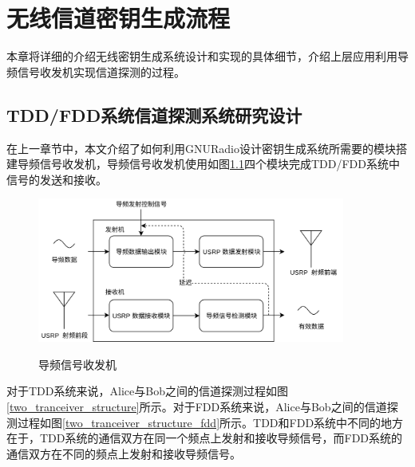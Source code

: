 



\chapter{无线信道密钥生成流程}

本章将详细的介绍无线密钥生成系统设计和实现的具体细节，介绍上层应用利用导频信号收发机实现信道探测的过程。%

\section{TDD/FDD系统信道探测系统研究设计}

在上一章节中，本文介绍了如何利用GNURadio设计密钥生成系统所需要的模块搭建导频信号收发机，导频信号收发机使用如图\ref{tranceiver_structure}四个模块完成TDD/FDD系统中信号的发送和接收。

\begin{figure}[htbp]
    \centering
    \includegraphics[width=0.9\textwidth]{images/tranceiver_structure}
    \caption{导频信号收发机}{} 
    \label{tranceiver_structure}
\end{figure}

对于TDD系统来说，Alice与Bob之间的信道探测过程如图\ref{two_tranceiver_structure}所示。对于FDD系统来说，Alice与Bob之间的信道探测过程如图\ref{two_tranceiver_structure_fdd}所示。TDD和FDD系统中不同的地方在于，TDD系统的通信双方在同一个频点上发射和接收导频信号，而FDD系统的通信双方在不同的频点上发射和接收导频信号。

